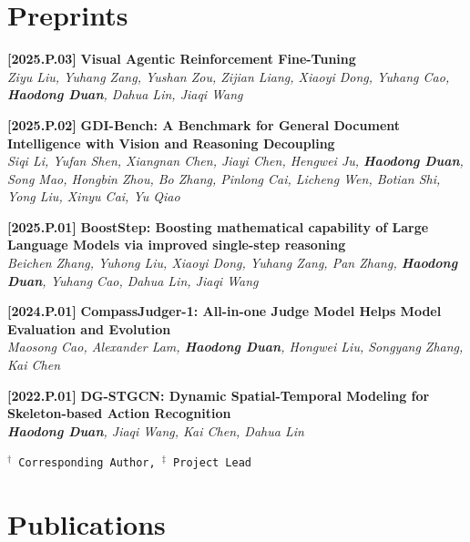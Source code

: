 \documentclass{resume}
\newcommand{\itemgap}{\vspace{-1mm}}%
\newcommand{\secgap}{\vspace{1mm}}%
\begin{document}
\secgap


\section{Preprints}

\footnotesize

\textbf{[2025.P.03]} \textbf{Visual Agentic Reinforcement Fine-Tuning} \\
\textit{Ziyu Liu, Yuhang Zang, Yushan Zou, Zijian Liang, Xiaoyi Dong, Yuhang Cao, \textbf{Haodong Duan}, Dahua Lin, Jiaqi Wang} \\

\itemgap

\textbf{[2025.P.02]} \textbf{GDI-Bench: A Benchmark for General Document Intelligence with Vision and Reasoning Decoupling} \\
\textit{Siqi Li, Yufan Shen, Xiangnan Chen, Jiayi Chen, Hengwei Ju, \textbf{Haodong Duan}, Song Mao, Hongbin Zhou, Bo Zhang, Pinlong Cai, Licheng Wen, Botian Shi, Yong Liu, Xinyu Cai, Yu Qiao} \\

\itemgap

\textbf{[2025.P.01]} \textbf{BoostStep: Boosting mathematical capability of Large Language Models via improved single-step reasoning} \\
\textit{Beichen Zhang, Yuhong Liu, Xiaoyi Dong, Yuhang Zang, Pan Zhang, \textbf{Haodong Duan}, Yuhang Cao, Dahua Lin, Jiaqi Wang} \\

\itemgap

\textbf{[2024.P.01]} \textbf{CompassJudger-1: All-in-one Judge Model Helps Model Evaluation and Evolution} \\
\textit{Maosong Cao, Alexander Lam, \textbf{Haodong Duan}, Hongwei Liu, Songyang Zhang, Kai Chen} \\ 

\itemgap

\textbf{[2022.P.01]} \textbf{DG-STGCN: Dynamic Spatial-Temporal Modeling for Skeleton-based Action Recognition} \\
\textit{\textbf{Haodong Duan}, Jiaqi Wang, Kai Chen, Dahua Lin} \\

\itemgap

\texttt{$^\dag$ Corresponding Author,  $^\ddag$ Project Lead}


\section{Publications}
\end{document}
